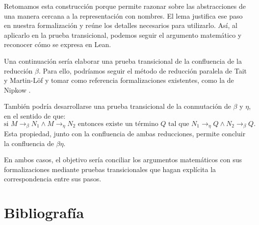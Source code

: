 \documentclass[
  spanish,
  letterpaper,
  DIV=11,
  numbers=noendperiod]{scrreprt}
\newcounter{none} %
\theoremstyle{remark}
\begin{document}
Retomamos esta construcción porque permite razonar sobre las
abstracciones de una manera cercana a la representación con nombres. El
lema justifica ese paso en nuestra formalización y reúne los detalles
necesarios para utilizarlo. Así, al aplicarlo en la prueba transicional,
podemos seguir el argumento matemático y reconocer cómo se expresa en
Lean.

Una continuación sería elaborar una prueba transicional de la
confluencia de la reducción \(\beta\). Para ello, podríamos seguir el
método de reducción paralela de Tait y Martin-Löf
\autocite{barendregt1984} y tomar como referencia formalizaciones
existentes, como la de Nipkow \autocite{nipkow2001}.

También podría desarrollarse una prueba transicional de la conmutación
de \(\beta\) y \(\eta\), en el sentido de que: \[
\text{si }
M\longrightarrow_\beta N_1 \land 
M\longrightarrow_\eta N_2
\text{ entonces existe un término $Q$ tal que }
N_1\longrightarrow_\eta Q \land 
N_2\longrightarrow_\beta Q.
\] Esta propiedad, junto con la confluencia de ambas reducciones,
permite concluir la confluencia de \(\beta\eta\).

En ambos casos, el objetivo sería conciliar los argumentos matemáticos
con sus formalizaciones mediante pruebas transicionales que hagan
explícita la correspondencia entre sus pasos.


\chapter*{Bibliografía}\label{bibliografuxeda}


\printbibliography[heading=none]
\end{document}

